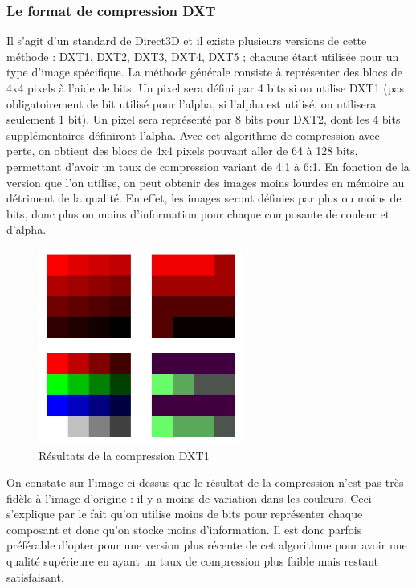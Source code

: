 \documentclass[a4paper, 11pt]{article} %
\begin{document}
\subsubsection{Le format de compression DXT}
Il s'agit d'un standard de Direct3D et il existe plusieurs versions de cette méthode : DXT1, DXT2, DXT3, DXT4, DXT5 ; chacune étant utilisée pour un type d'image spécifique. La méthode générale consiste à représenter des blocs de 4x4 pixels à l'aide de bits. Un pixel sera défini par 4 bits si on utilise DXT1 (pas obligatoirement de bit utilisé pour l'alpha, si l'alpha est utilisé, on utilisera seulement 1 bit). Un pixel sera représenté par 8 bits pour DXT2, dont les 4 bits supplémentaires définiront l'alpha. Avec cet algorithme de compression avec perte, on obtient des blocs de 4x4 pixels pouvant aller de 64 à 128 bits, permettant d'avoir un taux de compression variant de 4:1 à 6:1. En fonction de la version que l'on utilise, on peut obtenir des images moins lourdes en mémoire au détriment de la qualité. En effet, les images seront définies par plus ou moins de bits, donc plus ou moins d'information pour chaque composante de couleur et d'alpha.

\begin{figure}[!h]%
	\begin{center}
	\includegraphics[width=0.60\textwidth]{images/texture_dxt.png}%
	\caption{Résultats de la compression DXT1}%
	\label{}%
	\end{center}
\end{figure}

\newpage

On constate sur l'image ci-dessus que le résultat de la compression n'est pas très fidèle à l'image d'origine : il y a moins de variation dans les couleurs. Ceci s'explique par le fait qu'on utilise moins de bits pour représenter chaque composant et donc qu'on stocke moins d'information. Il est donc parfois préférable d'opter pour une version plus récente de cet algorithme pour avoir une qualité supérieure en ayant un taux de compression plus faible mais restant satisfaisant.
\end{document}

